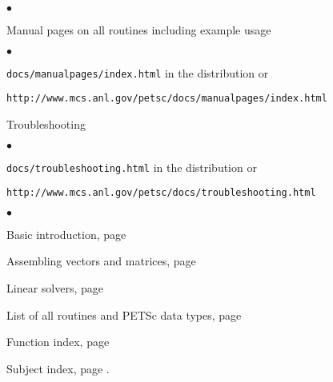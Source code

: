 \begin{list}{$\bullet$}
{
\setlength{\itemsep}{-.020in} 
\setlength{\topsep}{0in} 
\setlength{\partopsep}{0in}
}
\item Manual pages on all routines including example usage
\begin{list}{$\bullet$}
{
\setlength{\itemsep}{-.020in} 
\setlength{\topsep}{0in} 
\setlength{\partopsep}{0in}
}
   \item {\tt docs/manualpages/index.html} in the distribution or 
   \item {\tt http://www.mcs.anl.gov/petsc/docs/manualpages/index.html}
\end{list}
\item Troubleshooting
\begin{list}{$\bullet$}
{
\setlength{\itemsep}{-.020in} 
\setlength{\topsep}{0in} 
\setlength{\partopsep}{0in}
}
   \item {\tt docs/troubleshooting.html} in the distribution or
   \item {\tt http://www.mcs.anl.gov/petsc/docs/troubleshooting.html}
\end{list}
\end{list}

\begin{list}{$\bullet$}
{
\setlength{\itemsep}{-.02in} 
\setlength{\topsep}{0in} 
\setlength{\partopsep}{0in}
}
\item Basic introduction, page \pageref{sec:veccreate}
\item Assembling vectors and matrices, page \pageref{chapter:matrices}
\item Linear solvers, page \pageref{ch:sles}
\item List of all routines and PETSc data types, page \pageref{routines}
\item Function index, page \pageref{findex}
\item Subject index, page \pageref{sindex}.
\end{list}

